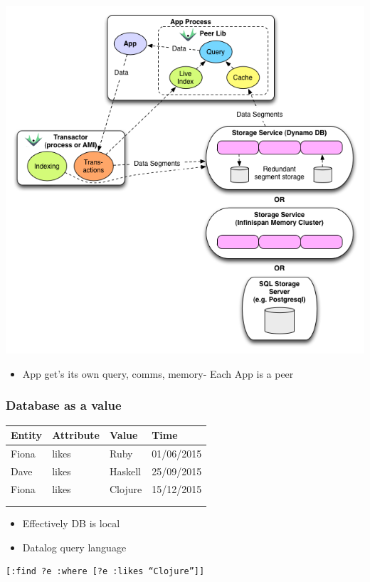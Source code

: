 \documentclass[11pt]{article}
\begin{document}
\includegraphics[width=.9\linewidth]{./datomic-architecture.png}

\begin{itemize}
\item App get's its own query, comms, memory- Each App is a peer
\end{itemize}

\subsubsection*{Database as a value}
\label{sec:orgheadline24}

\begin{center}
\begin{tabular}{llll}
Entity & Attribute & Value & Time\\
\hline
Fiona & likes & Ruby & 01/06/2015\\
Dave & likes & Haskell & 25/09/2015\\
Fiona & likes & Clojure & 15/12/2015\\
 &  &  & \\
\hline
 &  &  & \\
\end{tabular}
\end{center}

\begin{itemize}
\item Effectively DB is local
\item Datalog query language
\end{itemize}
\begin{verbatim}
[:find ?e :where [?e :likes “Clojure”]]
\end{verbatim}
\end{document}
